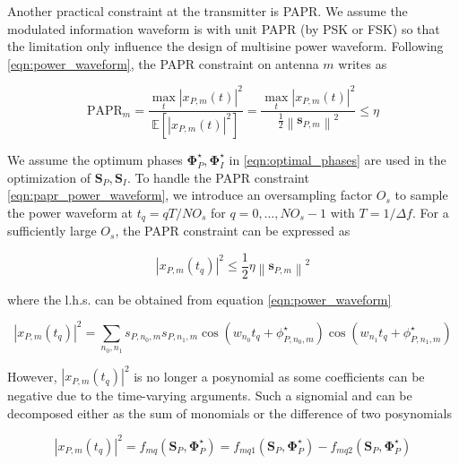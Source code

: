 Another practical constraint at the transmitter is PAPR. We assume the modulated information waveform is with unit PAPR (by PSK or FSK) so that the limitation only influence the design of multisine power waveform. Following \eqref{eqn:power_waveform}, the PAPR constraint on antenna $m$ writes as

\begin{equation}\label{eqn:papr_power_waveform}
  {\text{PAPR}_m} = \frac{{\mathop {\max }\limits_t {{\left| {{x_{P,m}}(t)} \right|}^2}}}{{\mathbb{E}\left[ {{{\left| {{x_{P,m}}(t)} \right|}^2}} \right]}} = \frac{{\mathop {\max }\limits_t {{\left| {{x_{P,m}}(t)} \right|}^2}}}{{\frac{1}{2}{{\left\| {{{\mathbf{s}}_{P,m}}} \right\|}^2}}} \leqslant \eta
\end{equation}

We assume the optimum phases ${\mathbf{\Phi }}_P^ \star ,{\mathbf{\Phi }}_I^ \star $ in \eqref{eqn:optimal_phases} are used in the optimization of ${{\mathbf{S}}_P},{{\mathbf{S}}_I}$. To handle the PAPR constraint \eqref{eqn:papr_power_waveform}, we introduce an oversampling factor ${O_s}$ to sample the power waveform at ${t_q} = qT/N{O_s}$ for $q = 0, \ldots ,N{O_s} - 1$ with $T = 1/\Delta f$. For a sufficiently large ${O_s}$, the PAPR constraint can be expressed as

\begin{equation}\label{eqn:papr_sample}
  {\left| {{x_{P,m}}\left( {{t_q}} \right)} \right|^2} \leqslant \frac{1}{2}\eta {\left\| {{{\mathbf{s}}_{P,m}}} \right\|^2}
\end{equation}

where the l.h.s. can be obtained from equation \eqref{eqn:power_waveform} 

\begin{equation}\label{eqn:papr_average_sample}
  {\left| {{x_{P,m}}\left( {{t_q}} \right)} \right|^2} = \sum\limits_{{n_0},{n_1}} {{s_{P,{n_0},m}}{s_{P,{n_1},m}}\cos \left( {{w_{{n_0}}}{t_q} + \phi _{P,{n_0},m}^ \star } \right)\cos \left( {{w_{{n_1}}}{t_q} + \phi _{P,{n_1},m}^ \star } \right)}
\end{equation}

However, ${\left| {{x_{P,m}}\left( {{t_q}} \right)} \right|^2}$ is no longer a posynomial as some coefficients can be negative due to the time-varying arguments. Such a signomial \cite{Boyd2007} and can be decomposed either as the sum of monomials or the difference of two posynomials

\begin{equation}\label{eqn:papr_signomial}
  {\left| {{x_{P,m}}\left( {{t_q}} \right)} \right|^2} = {f_{mq}}\left( {{{\mathbf{S}}_P},{\mathbf{\Phi }}_P^ \star } \right) = {f_{mq1}}\left( {{{\mathbf{S}}_P},{\mathbf{\Phi }}_P^ \star } \right) - {f_{mq2}}\left( {{{\mathbf{S}}_P},{\mathbf{\Phi }}_P^ \star } \right)
\end{equation}


